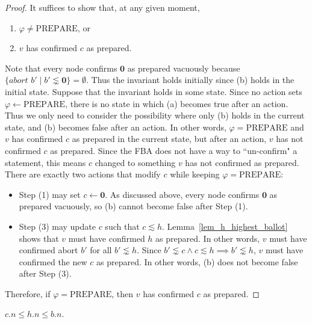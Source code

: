 \begin{proof}
    It suffices to show that, at any given moment,
    \begin{enumerate}[label=(\alph*)]
        \item %
            $\varphi \ne \text{PREPARE}$, or
        \item %
            $v$ has confirmed $c$ as prepared.
    \end{enumerate}
    Note that every node confirms $\textbf{0}$ as prepared vacuously because $\{ \textit{abort } b' \mid b' \lnsim \textbf{0} \} = \emptyset$.
    Thus the invariant holds initially since (b) holds in the initial state.
    Suppose that the invariant holds in some state.
    Since no action sets $\varphi \leftarrow \text{PREPARE}$, there is no state in which (a) becomes true after an action.
    Thus we only need to consider the possibility where only (b) holds in the current state, and (b) becomes false after an action.
    In other words, $\varphi = \text{PREPARE}$ and $v$ has confirmed $c$ as prepared in the current state, but after an action, $v$ has not confirmed $c$ as prepared.
    Since the FBA does not have a way to ``un-confirm" a statement, this means $c$ changed to something $v$ has not confirmed as prepared.
    There are exactly two actions that modify $c$ while keeping $\varphi = \text{PREPARE}$:
    \begin{itemize}
        \item
            Step (1) may set $c \leftarrow \textbf{0}$.
            As discussed above, every node confirms $\textbf{0}$ as prepared vacuously, so (b) cannot become false after Step (1).
        \item
            Step (3) may update $c$ such that $c \lesssim h$.
            Lemma~\ref{lem_h_highest_ballot} shows that $v$ must have confirmed $h$ as prepared.
            In other words, $v$ must have confirmed abort $b'$ for all $b' \lnsim h$.
            Since $b' \lnsim c \land c \lesssim h \implies b' \lnsim h$, $v$ must have confirmed the new $c$ as prepared.
            In other words, (b) does not become false after Step (3).
    \end{itemize}
    Therefore, if $\varphi = \text{PREPARE}$, then $v$ has confirmed $c$ as prepared.
\end{proof}

\begin{lem}\label{c_n_leq_h_n_leq_b_n}
    $c.n \leq h.n \leq b.n$.
\end{lem}

